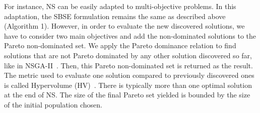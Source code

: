 For instance, NS can be easily adapted to multi-objective problems. In this adaptation, the SBSE formulation remains the same as described above (Algorithm 1). However, in order to evaluate the new discovered solutions, we have to consider two main objectives and add the non-dominated solutions to the Pareto non-dominated set. We apply the Pareto dominance relation to find solutions that are not Pareto dominated by any other solution discovered so far, like in NSGA-II~\cite{lokuciejewski2010multi, deb2002fast}. Then, this Pareto non-dominated set is returned as the result. The metric used to evaluate one solution compared to previously discovered ones is called Hypervolume (HV)~\cite{deb2001multi}.
There is typically more than one optimal solution at the end of NS. The size of the final Pareto set yielded is bounded by the size of the initial population chosen.
